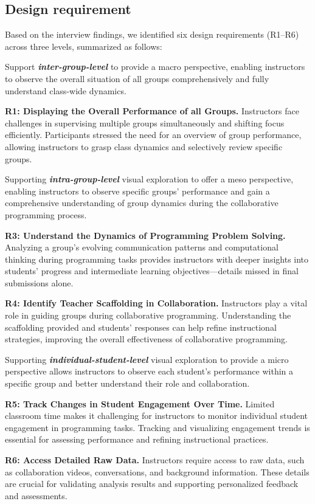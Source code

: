  
 
 
\subsection{Design requirement}
\label{dr}
Based on the interview findings, we identified six design requirements (R1–R6) across three levels, summarized as follows:

Support \textbf{\textit{inter-group-level}} to provide a macro perspective, enabling instructors to observe the overall situation of all groups comprehensively and fully understand class-wide dynamics.

\textbf{R1: Displaying the Overall Performance of all Groups.} 
Instructors face challenges in supervising multiple groups simultaneously and shifting focus efficiently. Participants stressed the need for an overview of group performance, allowing instructors to grasp class dynamics and selectively review specific groups.




Supporting \textbf{\textit{intra-group-level}} visual exploration to offer a meso perspective, enabling instructors to observe specific groups' performance and gain a comprehensive understanding of group dynamics during the collaborative programming process.


\textbf{ R3: Understand the Dynamics of Programming Problem Solving.}
Analyzing a group's evolving communication patterns and computational thinking during programming tasks provides instructors with deeper insights into students' progress and intermediate learning objectives—details missed in final submissions alone.


\textbf{ R4: Identify Teacher Scaffolding in Collaboration.}
Instructors play a vital role in guiding groups during collaborative programming. Understanding the scaffolding provided and students' responses can help refine instructional strategies, improving the overall effectiveness of collaborative programming.


Supporting \textbf{\textit{individual-student-level}} visual exploration to provide a micro perspective allows instructors to observe each student's performance within a specific group and better understand their role and collaboration.

\textbf{R5: Track Changes in Student Engagement Over Time.} 
Limited classroom time makes it challenging for instructors to monitor individual student engagement in programming tasks.
Tracking and visualizing engagement trends is essential for assessing performance and refining instructional practices.

\textbf{R6: Access Detailed Raw Data.} 
Instructors require access to raw data, such as collaboration videos, conversations, and background information. These details are crucial for validating analysis results and supporting personalized feedback and assessments.

